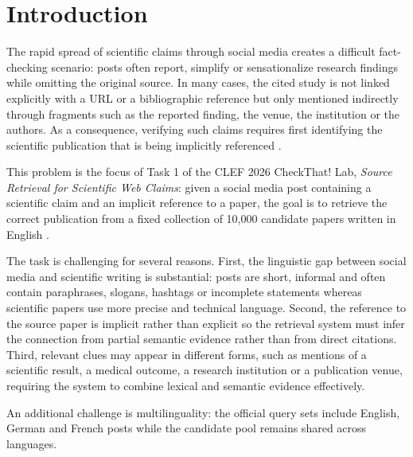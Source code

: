\section{Introduction}
\label{sec:introduction}

The rapid spread of scientific claims through social media creates a difficult fact-checking scenario: posts often report, simplify or sensationalize research findings while omitting the original source. In many cases, the cited study is not linked explicitly with a URL or a bibliographic reference but only mentioned indirectly through fragments such as the reported finding, the venue, the institution or the authors. As a consequence, verifying such claims requires first identifying the scientific publication that is being implicitly referenced \cite{10.1007/978-3-032-21321-1_43}.

This problem is the focus of Task 1 of the CLEF 2026 CheckThat! Lab, \emph{Source Retrieval for Scientific Web Claims}: given a social media post containing a scientific claim and an implicit reference to a paper, the goal is to retrieve the correct publication from a fixed collection of 10,000 candidate papers written in English \cite{clef-checkthat:2026:task1}.

The task is challenging for several reasons. First, the linguistic gap between social media and scientific writing is substantial: posts are short, informal and often contain paraphrases, slogans, hashtags or incomplete statements whereas scientific papers use more precise and technical language. Second, the reference to the source paper is implicit rather than explicit so the retrieval system must infer the connection from partial semantic evidence rather than from direct citations. Third, relevant clues may appear in different forms, such as mentions of a scientific result, a medical outcome, a research institution or a publication venue, requiring the system to combine lexical and semantic evidence effectively.

An additional challenge is multilinguality: the official query sets include English, German and French posts while the candidate pool remains shared across languages.

